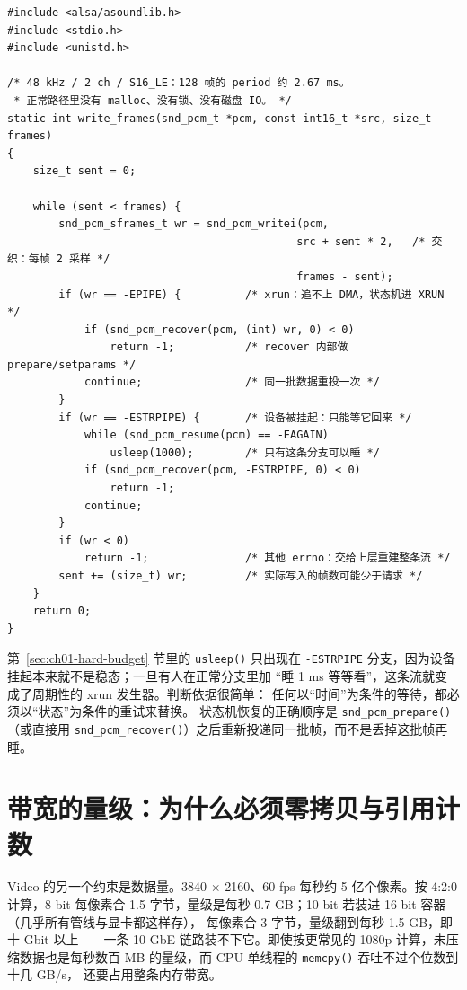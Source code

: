 \documentclass[12pt,a4paper,fontset=fandol]{ctexbook}
\newcommand{\Fn}[1]{\texttt{#1()}}
\newcommand{\Tp}[1]{\texttt{#1}}
\newcommand{\Lang}[1]{\textsf{#1}}
\newcommand{\DomVid}{\Lang{Video}}
\begin{document}
\begin{lstlisting}[style=cstyle,
  caption={ALSA 写循环：正常路径极简，xrun 与 suspend 走恢复分支},
  label={lst:ch01-alsa-loop}]
#include <alsa/asoundlib.h>
#include <stdio.h>
#include <unistd.h>

/* 48 kHz / 2 ch / S16_LE：128 帧的 period 约 2.67 ms。
 * 正常路径里没有 malloc、没有锁、没有磁盘 IO。 */
static int write_frames(snd_pcm_t *pcm, const int16_t *src, size_t frames)
{
    size_t sent = 0;

    while (sent < frames) {
        snd_pcm_sframes_t wr = snd_pcm_writei(pcm,
                                             src + sent * 2,   /* 交织：每帧 2 采样 */
                                             frames - sent);
        if (wr == -EPIPE) {          /* xrun：追不上 DMA，状态机进 XRUN */
            if (snd_pcm_recover(pcm, (int) wr, 0) < 0)
                return -1;           /* recover 内部做 prepare/setparams */
            continue;                /* 同一批数据重投一次 */
        }
        if (wr == -ESTRPIPE) {       /* 设备被挂起：只能等它回来 */
            while (snd_pcm_resume(pcm) == -EAGAIN)
                usleep(1000);        /* 只有这条分支可以睡 */
            if (snd_pcm_recover(pcm, -ESTRPIPE, 0) < 0)
                return -1;
            continue;
        }
        if (wr < 0)
            return -1;               /* 其他 errno：交给上层重建整条流 */
        sent += (size_t) wr;         /* 实际写入的帧数可能少于请求 */
    }
    return 0;
}
\end{lstlisting}

\begin{warning}[title={把恢复逻辑写成``再睡一会儿''}]
第~\ref{sec:ch01-hard-budget} 节里的 \Fn{usleep} 只出现在 \Tp{-ESTRPIPE}
分支，因为设备挂起本来就不是稳态；一旦有人在正常分支里加
``睡 1 ms 等等看''，这条流就变成了周期性的 xrun 发生器。判断依据很简单：
任何以``时间''为条件的等待，都必须以``状态''为条件的重试来替换。
状态机恢复的正确顺序是 \Fn{snd\_pcm\_prepare}（或直接用
\Fn{snd\_pcm\_recover}）之后重新投递同一批帧，而不是丢掉这批帧再睡。
\end{warning}

\section{带宽的量级：为什么必须零拷贝与引用计数}
\label{sec:ch01-bandwidth}

\DomVid{} 的另一个约束是数据量。3840 $\times$ 2160、60 fps 每秒约
5 亿个像素。按 4:2:0 计算，8 bit 每像素合 1.5 字节，量级是每秒
0.7 GB；10 bit 若装进 16 bit 容器（几乎所有管线与显卡都这样存），
每像素合 3 字节，量级翻到每秒 1.5 GB，即十 Gbit 以上——一条 10 GbE
链路装不下它。即使按更常见的 1080p 计算，未压缩数据也是每秒数百 MB
的量级，而 CPU 单线程的 \Fn{memcpy} 吞吐不过个位数到十几 GB/s，
还要占用整条内存带宽。
\end{document}
